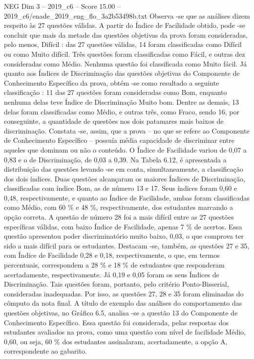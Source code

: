 \begin{textsample}{NEG Dim 3 – 2019\_c6 – Score 15.00 – 2019\_c6/enade\_2019\_eng\_flo\_3a2b53498b.txt}
Observa -se que as análises dizem respeito às 27 questões válidas.
A partir do Índice de Facilidade obtido, pode -se concluir que mais da metade das questões objetivas da prova foram consideradas, pelo menos, Difícil : das 27 questões válidas, 14 foram classificadas como Difícil ou como Muito difícil.
Três questões foram classificadas como Fácil, e outras dez consideradas como Médio.
Nenhuma questão foi classificada como Muito fácil.
Já quanto aos Índices de Discriminação das questões objetivas do Componente de Conhecimento Específico da prova, obtém -se como resultado a seguinte classificação : 11 das 27 questões foram consideradas como Bom, enquanto nenhuma delas teve Índice de Discriminação Muito bom.
Dentre as demais, 13 delas foram classificadas como Médio, e outras três, como Fraco, sendo 16, por conseguinte, a quantidade de questões nos dois patamares mais baixos de discriminação.
Constata -se, assim, que a prova – no que se refere ao Componente de Conhecimento Específico – possuía média capacidade de discriminar entre aqueles que dominam ou não o conteúdo.
O Índice de Facilidade variou de 0,07 a 0,83 e o de Discriminação, de 0,03 a 0,39.
Na Tabela 6.12, é apresentada a distribuição das questões levando -se em conta, simultaneamente, a classificação dos dois índices.
Duas questões alcançaram os maiores Índices de Discriminação, classificadas com índice Bom, as de número 13 e 17.
Seus índices foram 0,60 e 0,48, respectivamente, e quanto ao Índice de Facilidade, ambas foram classificadas como Médio, com 60 \% e 48 \%, respectivamente, dos estudantes marcando a opção correta.
A questão de número 28 foi a mais difícil entre as 27 questões específicas válidas, com baixo Índice de Facilidade, apenas 7 \% de acertos.
Essa questão apresentou poder discriminatório muito baixo, 0,03, o que comprova ter sido a mais difícil para os estudantes.
Destacam -se, também, as questões 27 e 35, com Índice de Facilidade 0,28 e 0,18, respectivamente, o que, em termos percentuais, correspondem a 28 \% e 18 \% de estudantes que responderam acertadamente, respectivamente.
Já 0,19 e 0,05 foram os seus Índices de Discriminação.
Tais questões foram, portanto, pelo critério Ponto-Bisserial, consideradas inadequadas.
Por isso, as questões 27, 28 e 35 foram eliminadas do cômputo da nota final.
A título de exemplo das análises do comportamento das questões objetivas, no Gráfico 6.5, analisa -se a questão 13 do Componente de Conhecimento Específico.
Essa questão foi considerada, pelas respostas dos estudantes avaliados na prova, como uma questão com nível de facilidade Médio, 0,60, ou seja, 60 \% dos estudantes assinalaram, acertadamente, a opção A, correspondente ao gabarito.

\end{textsample}
